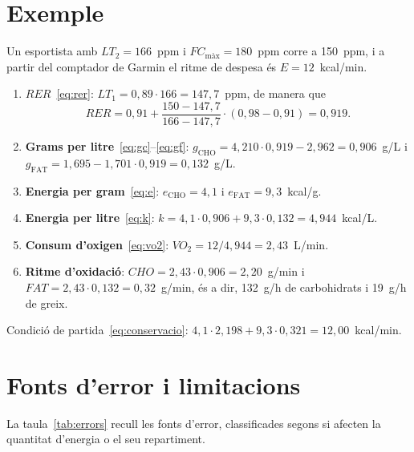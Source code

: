 \documentclass[10pt,a4paper]{article}
\newcommand{\sub}[1]{{\scriptscriptstyle\mathrm{#1}}}   %
\newcommand{\CHO}{\sub{CHO}}
\newcommand{\FAT}{\sub{FAT}}
\newcommand{\smax}{{\scriptscriptstyle\text{màx}}}
\newcommand{\cho}{\ensuremath{\mathit{CHO}}}               %
\newcommand{\fat}{\ensuremath{\mathit{FAT}}}
\newcommand{\VO}{\ensuremath{\mathit{VO}_2}}               %
\newcommand{\RER}{\ensuremath{\mathit{RER}}}
\newcommand{\FCmax}{\ensuremath{\mathit{FC}_{\smax}}}
\begin{document}
\section{Exemple}\label{sec:exemple}

Un esportista amb $LT_2=166$~ppm i $\FCmax=180$~ppm corre a 150~ppm, i a partir del
comptador de Garmin el ritme de despesa és $E=12$~kcal/min.
\begin{enumerate}
  \item \textbf{\RER}~\eqref{eq:rer}: $LT_1=0{,}89\cdot166=147{,}7$~ppm, de manera que
        \[
          \RER=0{,}91+\frac{150-147{,}7}{166-147{,}7}\cdot(0{,}98-0{,}91)=0{,}919 .
        \]
  \item \textbf{Grams per litre}~\eqref{eq:gc}--\eqref{eq:gf}:
        $g_{\CHO}=4{,}210\cdot0{,}919-2{,}962=0{,}906$~g/L i
        $g_{\FAT}=1{,}695-1{,}701\cdot0{,}919=0{,}132$~g/L.
  \item \textbf{Energia per gram}~\eqref{eq:e}: $e_{\CHO}=4{,}1$ i $e_{\FAT}=9{,}3$~kcal/g.
  \item \textbf{Energia per litre}~\eqref{eq:k}:
        $k=4{,}1\cdot0{,}906+9{,}3\cdot0{,}132=4{,}944$~kcal/L.
  \item \textbf{Consum d'oxigen}~\eqref{eq:vo2}: $\VO=12/4{,}944=2{,}43$~L/min.
  \item \textbf{Ritme d'oxidació}: $\cho=2{,}43\cdot0{,}906=2{,}20$~g/min
        i $\fat=2{,}43\cdot0{,}132=0{,}32$~g/min, és a dir, 132~g/h de carbohidrats i
        19~g/h de greix.
\end{enumerate}
Condició de partida~\eqref{eq:conservacio}: $4{,}1\cdot2{,}198+9{,}3\cdot0{,}321=12{,}00$~kcal/min.

\section{Fonts d'error i limitacions}\label{sec:limitacions}

La taula~\ref{tab:errors} recull les fonts d'error, classificades segons si afecten la
quantitat d'energia o el seu repartiment.
\end{document}
